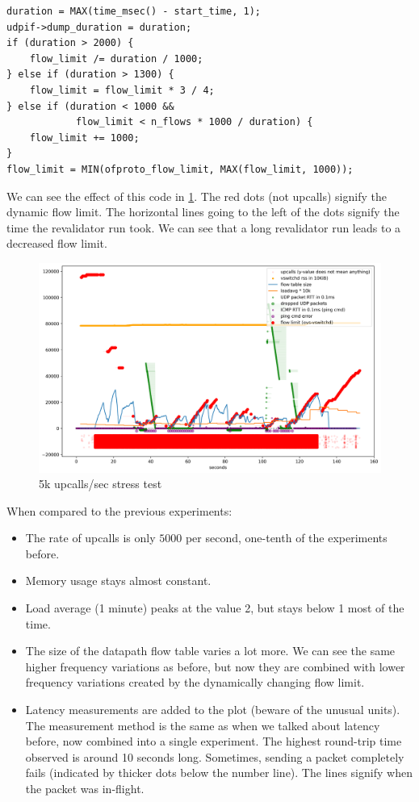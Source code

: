 \begin{verbatim}
duration = MAX(time_msec() - start_time, 1);
udpif->dump_duration = duration;
if (duration > 2000) {
    flow_limit /= duration / 1000;
} else if (duration > 1300) {
    flow_limit = flow_limit * 3 / 4;
} else if (duration < 1000 &&
            flow_limit < n_flows * 1000 / duration) {
    flow_limit += 1000;
}
flow_limit = MIN(ofproto_flow_limit, MAX(flow_limit, 1000));
\end{verbatim}

We can see the effect of this code in \cref{fig:packet-flood-limited}. The red dots (not upcalls) signify the dynamic flow limit. The horizontal lines going to the left of the dots signify the time the revalidator run took. We can see that a long revalidator run leads to a decreased flow limit.

\begin{figure}
    \centering
    \includegraphics[width=.9\linewidth]{img/packet_flood_limited_resources_50k.png}
    \caption{5k upcalls/sec stress test}
    \label{fig:packet-flood-limited}
\end{figure}

 When compared to the previous experiments:

\begin{itemize}
    \item The rate of upcalls is only $5000$ per second, one-tenth of the experiments before.
    \item Memory usage stays almost constant.
    \item Load average (1 minute) peaks at the value 2, but stays below 1 most of the time.
    \item The size of the datapath flow table varies a lot more. We can see the same higher frequency variations as before, but now they are combined with lower frequency variations created by the dynamically changing flow limit.
    \item Latency measurements are added to the plot (beware of the unusual units). The measurement method is the same as when we talked about latency before, now combined into a single experiment. The highest round-trip time observed is around 10 seconds long. Sometimes, sending a packet completely fails (indicated by thicker dots below the number line). The lines signify when the packet was in-flight.
\end{itemize}

